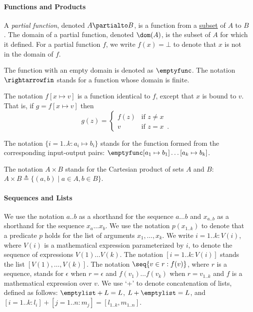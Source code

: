 \paragraph{Functions and Products \label{sec:FunctionsAndProducts}}

\begin{definition}
  A \emph{partial function}, denoted $A \partialto B$, is a function from a \underline{subset} of $A$ to $B$.
  The domain of a partial function, denoted $\dom(A)$, is the subset of $A$ for which it defined.
  For a partial function $f$, we write $f(x) = \bot$ to denote that $x$ is not in the domain of $f$.
\end{definition}

The function with an empty domain is denoted as $\emptyfunc$.
The notation $\rightarrowfin$ stands for a function whose domain is finite.

\begin{definition}
  The notation $f[x \mapsto v]$ is a function identical to $f$, except that $x$ is bound
  to $v$. That is, if  $g = f[x \mapsto v]$ then
  \[
    g(z) =
  \begin{cases}
    f(z) & \text{if } z \neq x\\
    v & \text{if } z = x \enspace .
  \end{cases}
  \]

  The notation $\{i=1..k: a_i\mapsto b_i\}$ stands for the function formed from the corresponding input-output pairs:
  $\emptyfunc[a_1\mapsto b_1]\ldots[a_k\mapsto b_k]$.
\end{definition}

The notation $A \times B$ stands for the Cartesian product of sets $A$ and $B$: $A \times B \triangleq \{(a,b) \;|\; a \in A, b \in B\}$.

\paragraph{Sequences and Lists}
We use the notation $a..b$ as a shorthand for the sequence $a\ldots b$ and $x_{a..b}$ as a shorthand for the sequence $x_a \ldots x_b$.
%
We use the notation $p(x_{1..k})$ to denote that a predicate $p$ holds for the list of arguments $x_1,\ldots,x_k$.
%
We write $i=1..k: V(i)$, where $V(i)$ is a mathematical expression parameterized by $i$,
to denote the sequence of expressions $V(1) \ldots V(k)$.
The notation $[i=1..k: V(i)]$ stands the list $[V(1),\ldots,V(k)]$.
The notation $\seq{v\in r: f(v)}$, where $r$ is a sequence, stands for $\epsilon$ when $r=\epsilon$ and
$f(v_1) \ldots f(v_k)$ when $r=v_{1..k}$ and $f$ is a mathematical expression over $v$.
%
We use `+' to denote concatenation of lists, defined as follows: $\emptylist + L = L$, $L + \emptylist = L$, and $[i=1..k: l_i] + [j=1..n: m_j] = [l_{1..k}, m_{1..n}]$.

